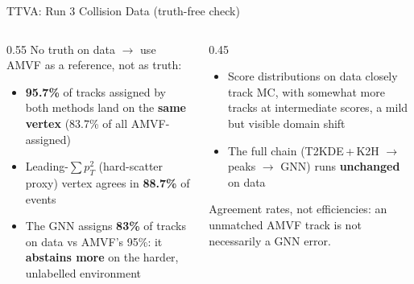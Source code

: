 \documentclass[xcolor=table,aspectratio=169]{beamer}
\begin{document}
\begin{frame}{TTVA: Run 3 Collision Data (truth-free check)}
    \begin{columns}[t]
        \begin{column}{0.55\linewidth}
            No truth on data \(\to\) use AMVF as a reference, not as truth:
            \begin{itemize}
                \setlength\itemsep{0.5em}
                \item \textbf{95.7\%} of tracks assigned by both methods land on the \textbf{same vertex} (83.7\% of all AMVF-assigned)
                \item Leading-\(\sum p_T^2\) (hard-scatter proxy) vertex agrees in \textbf{88.7\%} of events
                \item The GNN assigns \textbf{83\%} of tracks on data vs AMVF's 95\%: it \textbf{abstains more} on the harder, unlabelled environment
            \end{itemize}
        \end{column}
        \begin{column}{0.45\linewidth}
            \begin{itemize}
                \setlength\itemsep{0.5em}
                \item Score distributions on data closely track MC, with somewhat more tracks at intermediate scores, a mild but visible domain shift
                \item The full chain (T2KDE\,+\,K2H \(\to\) peaks \(\to\) GNN) runs \textbf{unchanged} on data
            \end{itemize}
            \vspace{0.4em}
            {\footnotesize\textcolor{black!55}{Agreement rates, not efficiencies: an unmatched AMVF track is not necessarily a GNN error.}}
        \end{column}
    \end{columns}
\end{frame}
\end{document}
